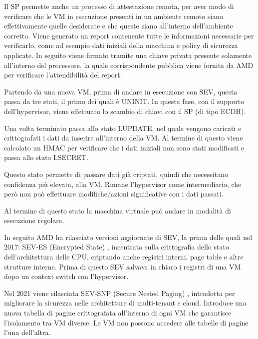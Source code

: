 \documentclass[12pt,italian]{report}
\begin{document}
	\bigbreak
	
	Il SP permette anche un processo di attestazione remota, per aver modo di verificare che le VM in esecuzione presenti in un ambiente remoto siano effettivamente quelle desiderate e che queste siano all'interno dell'ambiente corretto. Viene generato un report contenente tutte le informazioni necessarie per verificarlo, come ad esempio dati iniziali della macchina e policy di sicurezza applicate. In seguito viene firmato tramite una chiave privata presente solamente all'interno del processore, la quale corrispondente pubblica viene fornita da AMD per verificare l'attendibilità del report.
	
	\bigbreak
	
	Partendo da una nuova VM, prima di andare in esecuzione con SEV, questa passa da tre stati, il primo dei quali è UNINIT. In questa fase, con il supporto dell'hypervisor, viene effettuato lo scambio di chiavi con il SP (di tipo ECDH). 
	
	Una volta terminato passa allo stato LUPDATE, nel quale vengono caricati e crittografati i dati da inserire all'interno della VM. Al termine di questo viene calcolato un HMAC per verificare che i dati iniziali non sono stati modificati e passa allo stato LSECRET.
	
	Questo stato permette di passare dati già criptati, quindi che necessitano confidenza più elevata, alla VM. Rimane l'hypervisor come intermediario, che però non può effettuare modifiche/azioni significative con i dati passati. 
	
	Al termine di questo stato la macchina virtuale può andare in modalità di esecuzione regolare.
	
	\bigbreak
	
	In seguito AMD ha rilasciato versioni aggiornate di SEV, la prima delle quali nel 2017: SEV-ES (Encrypted State) \cite{sev_es}, incentrata sulla crittografia dello stato dell'architettura delle CPU, criptando anche registri interni, page table e altre strutture interne. Prima di questo SEV salvava in chiaro i registri di una VM dopo un context switch con l'hypervisor.
	
	Nel 2021 viene rilasciata SEV-SNP (Secure Nested Paging) \cite{sev_snp}, introdotta per migliorare la sicurezza nelle architetture di multi-tenant e cloud. Introduce una nuova tabella di pagine crittografata all'interno di ogni VM che garantisce l'isolamento tra VM diverse. Le VM non possono accedere alle tabelle di pagine l'una dell'altra.
	
	\newpage
	
\end{document}
